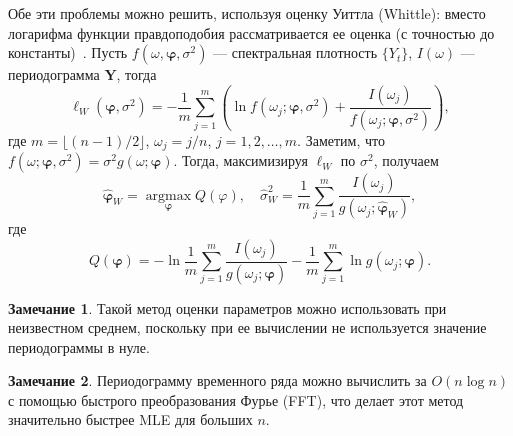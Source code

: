 \documentclass[specialist,
substylefile = spbu_report.rtx,
subf,href,colorlinks=true, 12pt]{disser}
\theoremstyle{definition}
\newtheorem{remark}{Замечание}[section]
\begin{document}
Обе эти проблемы можно решить, используя оценку Уиттла (Whittle): вместо логарифма функции правдоподобия рассматривается ее оценка (с точностью до константы)~\cite{Whittle1953}. Пусть $f(\omega, \bm\varphi, \sigma^2)$ --- спектральная плотность $\{Y_t\}$, $I(\omega)$ --- периодограмма $\bm Y$, тогда
\[
	\ell_W(\bm\varphi, \sigma^2)=-\frac1m\sum_{j=1}^m\left(\ln f(\omega_j; \bm\varphi, \sigma^2) + \frac{I(\omega_j)}{f(\omega_j; \bm\varphi, \sigma^2)}\right),
\]
где $m=\lfloor(n-1)/2\rfloor$, $\omega_j = j / n$, $j=1,2,\ldots,m$. Заметим, что $f(\omega; \bm\varphi, \sigma^2)=\sigma^2 g(\omega; \bm\varphi)$. Тогда, максимизируя $\ell_W$ по $\sigma^2$, получаем
\[
	\widehat{\bm\varphi}_W = \operatorname*{argmax}_{\bm\varphi}Q(\varphi),\quad \widehat\sigma_W^2=\frac1m \sum_{j=1}^m\frac{I(\omega_j)}{g(\omega_j; \widehat{\bm\varphi}_W)},
\]
где
\[
	Q(\bm\varphi)=-\ln\frac1m \sum_{j=1}^m\frac{I(\omega_j)}{g(\omega_j; \bm\varphi)} - \frac1m \sum_{j=1}^m\ln g(\omega_j; \bm\varphi).
\]
\begin{remark}
	Такой метод оценки параметров можно использовать при неизвестном среднем, поскольку при ее вычислении не используется значение периодограммы в нуле.
\end{remark}
\begin{remark}
	Периодограмму временного ряда можно вычислить за $O(n\log n)$ с помощью быстрого преобразования Фурье (FFT), что делает этот метод значительно быстрее MLE для больших $n$.
\end{remark}
\end{document}
